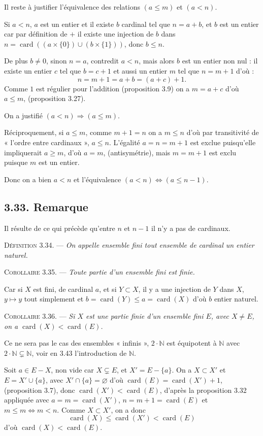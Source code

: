 Il reste à justifier l'équivalence des relations $(a\le m)$ et $(a<n)$.

Si $a<n$, $a$ est un entier et il existe $b$ cardinal tel que $n=a+b$, et $b$ est un entier car par définition de $+$ il existe une injection de $b$ dans $n=\operatorname{card}((a\times\{0\})\cup(b\times\{1\}))$, donc $b\le n$.

De plus $b\ne0$, sinon $n=a$, contredit $a<n$, mais alors $b$ est un entier non nul : il existe un entier $c$ tel que $b=c+1$ et aussi un entier $m$ tel que $n=m+1$ d'où :
\[
n=m+1=a+b=(a+c)+1.
\]
Comme $1$ est régulier pour l'addition (proposition 3.9) on a $m=a+c$ d'où $a\le m$, (proposition 3.27).

On a justifié $(a<n)\Rightarrow(a\le m)$.

Réciproquement, si $a\le m$, comme $m+1=n$ on a $m\le n$ d'où par transitivité de « l'ordre entre cardinaux », $a\le n$. L'égalité $a=n=m+1$ est exclue puisqu'elle impliquerait $a\ge m$, d'où $a=m$, (antisymétrie), mais $m=m+1$ est exclu puisque $m$ est un entier.

Donc on a bien $a<n$ et l'équivalence $(a<n)\Leftrightarrow(a\le n-1)$. \bookend

\subsection*{3.33. Remarque}
Il résulte de ce qui précède qu'entre $n$ et $n-1$ il n'y a pas de cardinaux.

\medskip\noindent\textsc{Définition 3.34.} --- \emph{On appelle ensemble fini tout ensemble de cardinal un entier naturel.}

\medskip\noindent\textsc{Corollaire 3.35.} --- \emph{Toute partie d'un ensemble fini est finie.}

Car si $X$ est fini, de cardinal $a$, et si $Y\subset X$, il y a une injection de $Y$ dans $X$, $y\mapsto y$ tout simplement et $b=\operatorname{card}(Y)\le a=\operatorname{card}(X)$ d'où $b$ entier naturel. \bookend

\medskip\noindent\textsc{Corollaire 3.36.} --- \emph{Si $X$ est une partie finie d'un ensemble fini $E$, avec $X\ne E$, on a $\operatorname{card}(X)<\operatorname{card}(E)$.}

Ce ne sera pas le cas des ensembles « infinis », $2\cdot\mathbb N$ est équipotent à $\mathbb N$ avec $2\cdot\mathbb N\subsetneq\mathbb N$, voir en 3.43 l'introduction de $\mathbb N$.

Soit $a\in E-X$, non vide car $X\subsetneq E$, et $X'=E-\{a\}$. On a $X\subset X'$ et $E=X'\cup\{a\}$, avec $X'\cap\{a\}=\varnothing$ d'où $\operatorname{card}(E)=\operatorname{card}(X')+1$, (proposition 3.7), donc $\operatorname{card}(X')<\operatorname{card}(E)$, d'après la proposition 3.32 appliquée avec $a=m=\operatorname{card}(X')$, $n=m+1=\operatorname{card}(E)$ et $m\le m\Leftrightarrow m<n$. Comme $X\subset X'$, on a donc
\[
\operatorname{card}(X)\le\operatorname{card}(X')<\operatorname{card}(E)
\]
d'où $\operatorname{card}(X)<\operatorname{card}(E)$. \bookend

